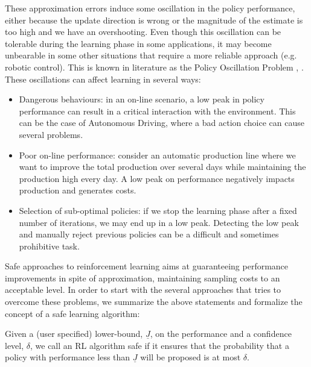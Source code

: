 These approximation errors induce some oscillation in the policy performance, either because the update direction is wrong or the magnitude of the estimate is too high and we have an overshooting. Even though this oscillation can be tolerable during the learning phase in some applications, it may become unbearable in some other situations that require a more reliable approach (e.g. robotic control). This is known in literature as the Policy Oscillation Problem \cite{Bertsekas2011}, \cite{NIPS2011_4274}. These oscillations can affect learning in several ways:
\begin{itemize}
\item Dangerous behaviours: in an on-line scenario, a low peak in policy performance can result in a critical interaction with the environment. This can be the case of Autonomous Driving, where a bad action choice can cause several problems.
\item Poor on-line performance: consider an automatic production line where we want to improve the total production over several days while maintaining the production high every day. A low peak on performance negatively impacts production and generates costs.
\item Selection of sub-optimal policies: if we stop the learning phase after a fixed number of iterations, we may end up in a low peak. Detecting the low peak and manually reject previous policies can be a difficult and sometimes prohibitive task.
\end{itemize}

Safe approaches to reinforcement learning aims at guaranteeing performance improvements in spite of approximation, maintaining  sampling costs to an acceptable level.
In order to start with the several approaches that tries to overcome these problems, we summarize the above statements and formalize the concept of a safe learning algorithm:
\begin{definition}
Given a (user specified) lower-bound, $\underline{J}$, on the performance and a confidence level, $\delta$, we call an RL algorithm safe if it ensures that the probability that a policy with performance less than $\underline{J}$ will be proposed is at most $\delta$.
\end{definition}

